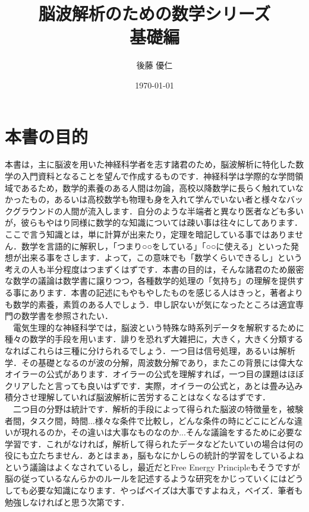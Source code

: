 \documentclass[11pt,a4paper,uplatex]{ujreport}
\title{脳波解析のための数学シリーズ\\
基礎編}
\author{後藤 優仁}
\date{\today}
\begin{document}
\maketitle
%
%
\tableofcontents

\newpage
\section{本書の目的}
本書は，主に脳波を用いた神経科学者を志す諸君のため，脳波解析に特化した数学の入門資料となることを望んで作成するものです．神経科学は学際的な学問領域であるため，数学的素養のある人間は勿論，高校以降数学に長らく触れていなかったもの，あるいは高校数学も物理も身を入れて学んでいない者と様々なバックグラウンドの人間が流入します．自分のような半端者と異なり医者なども多いが，彼らもやはり同様に数学的な知識については疎い事は往々にしてあります．ここで言う知識とは，単に計算が出来たり，定理を暗記している事ではありません．数学を言語的に解釈し，「つまり○○をしている」「○○に使える」といった発想が出来る事をさします．よって，この意味でも「数学くらいできるし」という考えの人も半分程度はつまずくはずです．本書の目的は，そんな諸君のため厳密な数学の議論は数学書に譲りつつ，各種数学的処理の「気持ち」の理解を提供する事にあります．本書の記述にもやもやしたものを感じる人はきっと，著者よりも数学的素養，素質のある人でしょう．申し訳ないが気になったところは適宜専門の数学書を参照されたい．\\
　電気生理的な神経科学では，脳波という特殊な時系列データを解釈するために種々の数学的手段を用います．誹りを恐れず大雑把に，大きく，大きく分類するなればこれらは三種に分けられるでしょう．一つ目は信号処理，あるいは解析学．その基礎となるのが波の分解，周波数分解であり，またこの背景には偉大なオイラーの公式があります．オイラーの公式を理解すれば，一つ目の課題はほぼクリアしたと言っても良いはずです．実際，オイラーの公式と，あとは畳み込み積分させ理解していれば脳波解析に苦労することはなくなるはずです．\\
　二つ目の分野は統計です．解析的手段によって得られた脳波の特徴量を，被験者間，タスク間，時間...様々な条件で比較し，どんな条件の時にどこにどんな違いが現れるのか，その違いは大事なものなのか...そんな議論をするために必要な学習です．これがなければ，解析して得られたデータなどたいていの場合は何の役にも立たちません．あとはまぁ，脳もなにかしらの統計的学習をしているよねという議論はよくなされているし，最近だとFree Energy Principleもそうですが脳の従っているなんらかのルールを記述するような研究をかじっていくにはどうしても必要な知識になります．やっぱベイズは大事ですよねえ，ベイズ．筆者も勉強しなければと思う次第です．\\
\end{document}
